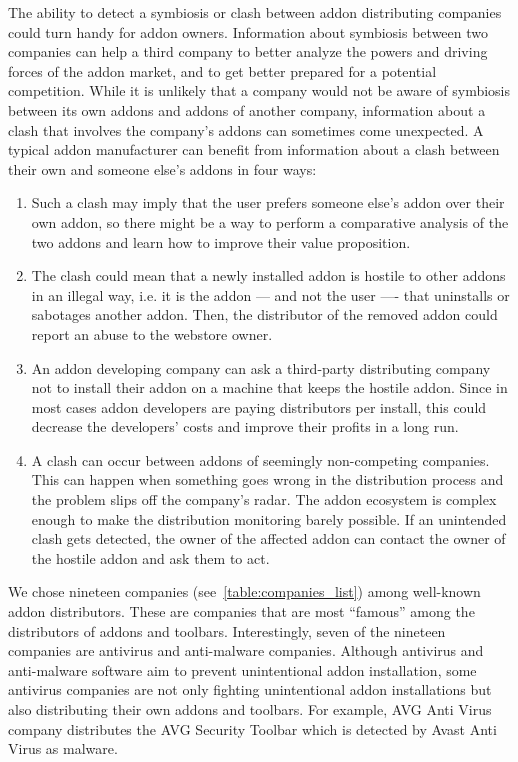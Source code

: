 \documentclass[11pt,oneside]{book}
\let\Oldsection\section
\renewcommand{\section}{\FloatBarrier\Oldsection}
\begin{document}
The ability to detect a symbiosis or clash between addon distributing companies could turn handy for addon owners. Information about symbiosis between two companies can help a third company to better analyze the powers and driving forces of the addon market, and to get better prepared for a potential competition. While it is unlikely that a company would not be aware of symbiosis between its own addons and addons of another company, information about a clash that involves the company's addons can sometimes come unexpected. A typical addon manufacturer can benefit from information about a clash between their own and someone else's addons in four ways:
\begin{enumerate}
\item Such a clash may imply that the user prefers someone else's addon over their own addon, so there might be a way to perform a comparative analysis of the two addons and learn how to improve their value proposition.
\item The clash could mean that a newly installed addon is hostile to other addons in an illegal way, i.e. it is the addon --- and not the user ---- that uninstalls or sabotages another addon. Then, the distributor of the removed addon could report an abuse to the webstore owner.
\item An addon developing company can ask a third-party distributing company not to install their addon on a machine that keeps the hostile addon. Since in most cases addon developers are paying distributors per install, this could decrease the developers' costs and improve their profits in a long run.
\item A clash can occur between addons of seemingly non-competing companies. This can happen when something goes wrong in the distribution process and the problem slips off the company's radar. The addon ecosystem is complex enough to make the distribution monitoring barely possible. If an unintended clash gets detected, the owner of the affected addon can contact the owner of the hostile addon and ask them to act.
\end{enumerate}

We chose nineteen companies (see~\autoref{table:companies_list}) among well-known addon distributors. These are companies that are most ``famous'' among the distributors of addons and toolbars. Interestingly, seven of the nineteen companies are antivirus and anti-malware companies. 
Although antivirus and anti-malware software aim to prevent unintentional addon installation, some antivirus companies are not only fighting unintentional addon installations but also distributing their own addons and toolbars. For example, AVG Anti Virus company distributes the AVG Security Toolbar which is detected by Avast Anti Virus as malware.  
\end{document}
